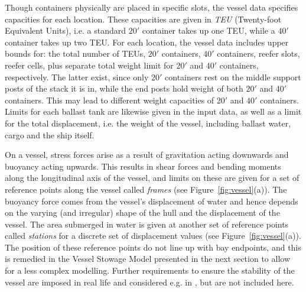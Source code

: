 Though containers physically are placed in specific slots, the vessel data specifies capacities for each location. These capacities are given in \emph{TEU} (Twenty-foot Equivalent Units), i.e. a standard $20'$ container takes up one TEU, while a $40'$ container takes up two TEU. For each location, the vessel data includes upper bounds for: the total number of TEUs, $20'$ containers, $40'$ containers, reefer slots, reefer cells, plus separate total weight limit for $20'$ and $40'$ containers, respectively. The latter exist, since only $20'$ containers rest on the middle support posts of the stack it is in, while the end posts hold weight of both $20'$ and $40'$ containers. This may lead to different weight capacities of $20'$ and $40'$ containers. Limits for each ballast tank are likewise given in the input data, as well as a limit for the total displacement, i.e. the weight of the vessel, including ballast water, cargo and the ship itself. 

On a vessel, stress forces arise as a result of gravitation acting downwards and buoyancy acting upwards. This results in shear forces and bending moments along the longitudinal axis of the vessel, and limits on these are given for a set of reference points along the vessel called \emph{frames} (see Figure~\ref{fig:vessel}(a)). The buoyancy force comes from the vessel's displacement of water and hence depends on the varying (and irregular) shape of the hull and the displacement of the vessel. The area submerged in water is given at another set of reference points called \emph{stations} for a discrete set of displacement values (see Figure~\ref{fig:vessel}(a)).
The position of these reference points do not line up with bay endpoints, and this is remedied in the Vessel Stowage Model presented in the next section to allow for a less complex modelling. Further requirements to ensure the stability of the vessel are imposed in real life and considered e.g. in \cite{AlbertosThesis}, but are not included here.

